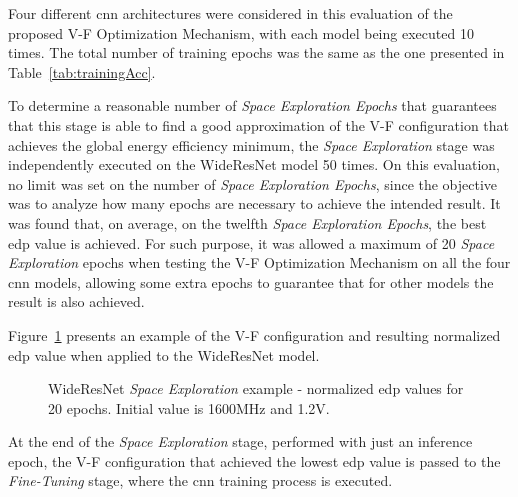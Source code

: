 Four different \acrshort{cnn} architectures were considered in this evaluation of the proposed V-F Optimization Mechanism, with each model being executed 10 times. The total number of training epochs was the same as the one presented in Table~\ref{tab:trainingAcc}.

To determine a reasonable number of \textit{Space Exploration Epochs} that guarantees that this stage is able to find a good approximation of the V-F configuration that achieves the global energy efficiency minimum, the \textit{Space Exploration} stage was independently executed on the WideResNet model 50 times. On this evaluation, no limit was set on the number of \textit{Space Exploration Epochs}, since the objective was to analyze how many epochs are necessary to achieve the intended result. It was found that, on average, on the twelfth \textit{Space Exploration Epochs}, the best \acrshort{edp} value is achieved.
For such purpose, it was allowed a maximum of 20 \textit{Space Exploration} epochs when testing the V-F Optimization Mechanism on all the four \acrshort{cnn} models, allowing some extra epochs to guarantee that for other models the result is also achieved.

Figure~\ref{fig:3d} presents an example of the V-F configuration and resulting normalized \acrshort{edp} value when applied to the WideResNet model.

\begin{figure}[h]
\centering
    \caption{WideResNet \textit{Space Exploration} example - normalized \acrshort{edp} values for 20 epochs. Initial value is 1600MHz and 1.2V.}
    \label{fig:3d}
\end{figure}


At the end of the \textit{Space Exploration} stage, performed with just an inference epoch, the V-F configuration that achieved the lowest \acrshort{edp} value is passed to the \textit{Fine-Tuning} stage, where the \acrshort{cnn}  training process is executed.

